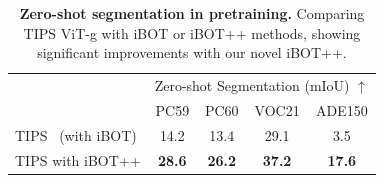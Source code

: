 
\begin{table}[t]
\caption{\small\textbf{Zero-shot segmentation in pretraining.} Comparing TIPS ViT-g with iBOT or iBOT++ methods, showing significant improvements with our novel iBOT++.}
\vspace{-1mm}
\scriptsize
\centering
{
\begin{tabular}{l c c c c}
\small \multirow{2}{*}{Model} & \multicolumn{4}{c}{Zero-shot Segmentation (mIoU) $\uparrow$} \\
& PC59 & PC60 & VOC21 & ADE150  \\
\midrule
TIPS~\cite{tips_paper} (with iBOT) & 14.2 & 13.4 & 29.1 & 3.5 \\ 
TIPS with iBOT++ & \bf{28.6} & \bf{26.2} & \bf{37.2} & \bf{17.6} \\
\end{tabular}
}
\vspace{-0mm}
\label{tab:fromscratch_distill}
\end{table}

